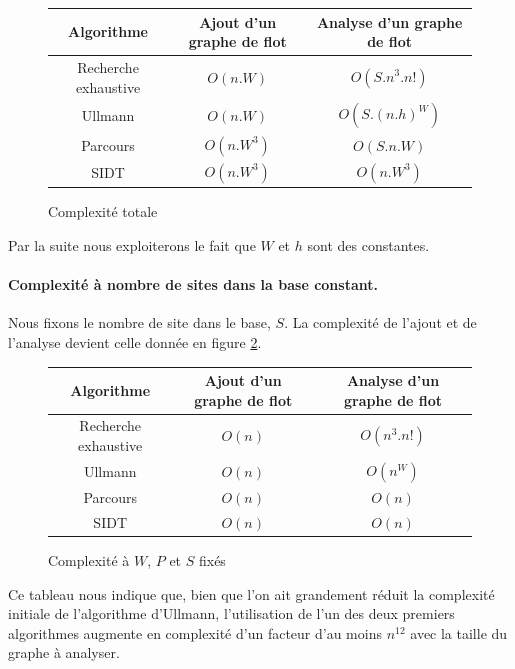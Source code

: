\begin{figure}[h]
\begin{center}
\begin{tabular}{|c|c|c|}
 \hline
 Algorithme & Ajout d'un graphe de flot & Analyse d'un graphe de flot\\
 \hline
 Recherche exhaustive & $O(n.W)$ & $O(S.n^3.n!)$\\
 Ullmann & $O(n.W)$ & $O(S.(n.h)^W)$ \\
 Parcours & $O(n.W^3)$ & $O(S.n.W)$\\
 SIDT & $O(n.W^3)$ & $O(n.W^3)$\\
 \hline
\end{tabular} 
\end{center}
\caption{Complexité totale}
\label{fig:complexite_1}
\end{figure}

Par la suite nous exploiterons le fait que $W$ et $h$ sont des constantes.

\paragraph{Complexité à nombre de sites dans la base constant.}
Nous fixons le nombre de site dans le base, $S$.
La complexité de l'ajout et de l'analyse devient celle donnée en figure \ref{fig:complexite_2}.

\begin{figure}[h]
\begin{center}
\begin{tabular}{|c|c|c|}
 \hline
 Algorithme & Ajout d'un graphe de flot & Analyse d'un graphe de flot\\
 \hline
 Recherche exhaustive & $O(n)$ & $O(n^3.n!)$\\
 Ullmann & $O(n)$ & $O(n^W)$ \\
 Parcours & $O(n)$ & $O(n)$\\
 SIDT & $O(n)$ & $O(n)$\\
 \hline
\end{tabular} 
\end{center}
\caption{Complexité à $W$, $P$ et $S$ fixés}
\label{fig:complexite_2}
\end{figure}

Ce tableau nous indique que, bien que l'on ait grandement réduit la complexité initiale de l'algorithme d'Ullmann, l'utilisation de l'un des deux premiers algorithmes augmente en complexité d'un facteur d'au moins $n^{12}$ avec la taille du graphe à analyser.


